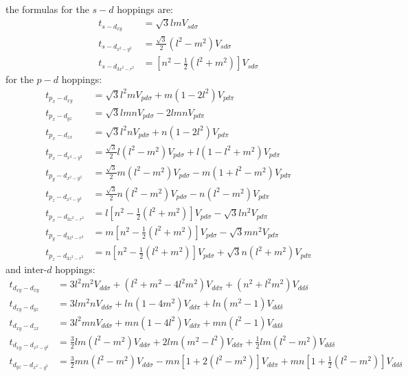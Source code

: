 the formulas for the $s-d$ hoppings are:
\begin{equation*}
\begin{split}
  t_{s-d_{xy}} &= \sqrt{3}lm V_{sd\sigma}\\
  t_{s-d_{x^2-y^2}} &= \tfrac{\sqrt{3}}{2} (l^2-m^2) V_{sd\sigma}\\
  t_{s-d_{3x^2-r^2}} &= \left[n^2-\frac{1}{2}(l^2+m^2)\right] V_{sd\sigma}
\end{split}
\end{equation*}
for the $p-d$ hoppings:
\begin{equation*}
\begin{split}
  t_{p_x-d_{xy}} &= \sqrt{3}l^2m V_{pd\sigma} + m(1-2l^2) V_{pd\pi}\\
  t_{p_x-d_{yz}} &= \sqrt{3}lmn V_{pd\sigma} - 2lmn V_{pd\pi}\\
  t_{p_x-d_{zx}} &= \sqrt{3}l^2n V_{pd\sigma} + n(1-2l^2) V_{pd\pi}\\
  t_{p_x-d_{x^2-y^2}} &= \frac{\sqrt{3}}{2}l(l^2-m^2) V_{pd\sigma} +
                         l(1-l^2+m^2) V_{pd\pi}\\
  t_{p_y-d_{x^2-y^2}} &= \tfrac{\sqrt{3}}{2}m(l^2-m^2) V_{pd\sigma} -
                         m(1+l^2-m^2) V_{pd\pi}\\
  t_{p_z-d_{x^2-y^2}} &= \tfrac{\sqrt{3}}{2}n(l^2-m^2) V_{pd\sigma} -
                         n(l^2-m^2) V_{pd\pi}\\
  t_{p_x-d_{3z^2-r^2}} &= l\left[n^2-\tfrac{1}{2}(l^2+m^2)\right] V_{pd\sigma}-
                          \sqrt{3}ln^2 V_{pd\pi}\\
  t_{p_y-d_{3z^2-r^2}} &= m\left[n^2-\tfrac{1}{2}(l^2+m^2)\right] V_{pd\sigma}-
                          \sqrt{3}mn^2 V_{pd\pi}\\
  t_{p_z-d_{3z^2-r^2}} &= n\left[n^2-\tfrac{1}{2}(l^2+m^2)\right] V_{pd\sigma}+
                          \sqrt{3}n(l^2+m^2) V_{pd\pi}
\end{split}
\end{equation*}
and inter-$d$ hoppings:
\begin{equation*}
\begin{split}
  t_{d_{xy}-d_{xy}} &= 3l^2m^2 V_{dd\sigma} + (l^2 + m^2 - 4l^2m^2) V_{dd\pi}+
                       (n^2+l^2m^2) V_{dd\delta}\\
  t_{d_{xy}-d_{yz}} &= 3lm^2n V_{dd\sigma} + ln(1-4m^2) V_{dd\pi}+
                       ln(m^2-1) V_{dd\delta}\\
  t_{d_{xy}-d_{zx}} &= 3l^2mn V_{dd\sigma} + mn(1-4l^2) V_{dd\pi}+
                       mn(l^2-1) V_{dd\delta}\\
  t_{d_{xy}-d_{x^2-y^2}} &= \tfrac{3}{2}lm(l^2-m^2) V_{dd\sigma} +
                            2lm(m^2-l^2) V_{dd\pi}+
                            \tfrac{1}{2}lm(l^2-m^2) V_{dd\delta}\\
  t_{d_{yz}-d_{x^2-y^2}} &= \tfrac{3}{2}mn(l^2-m^2) V_{dd\sigma} -
                            mn\left[1+2(l^2-m^2)\right]V_{dd\pi}+
                            mn\left[1+\tfrac{1}{2}(l^2-m^2)\right] V_{dd\delta}
\end{split}  %
\end{equation*}

